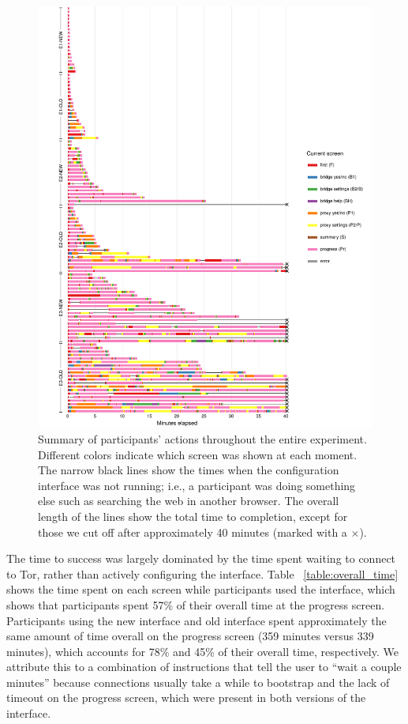 \documentclass[USenglish,oneside,twocolumn]{article}
\begin{document}
\begin{figure}
\centering
\includegraphics{all-participant-edges-scales}
\caption{
Summary of participants' actions throughout the entire experiment.
Different colors indicate which screen was shown at each moment.
The narrow black lines show the times when the configuration interface
was not running; i.e., a participant was doing something else
such as searching the web in another browser.
The overall length of the lines show the total time to completion,
except for those we cut off after approximately 40 minutes
(marked with a $\times$).
}
\label{fig:all-participant-edges}
\end{figure}

The time to success was largely dominated by the time spent waiting to connect to Tor, rather than actively configuring the interface. Table ~\ref{table:overall_time} shows the time spent on each screen while participants used the interface, which shows that participants spent 57\% of their overall time at the progress screen. Participants using the new interface and old interface spent approximately the same amount of time overall on the progress screen (359 minutes versus 339 minutes), which accounts for 78\% and 45\% of their overall time, respectively. We attribute this to a combination of instructions that tell the user to ``wait a couple minutes'' because connections usually take a while to bootstrap and the lack of timeout on the progress screen, which were present in both versions of the interface. 
\end{document}
